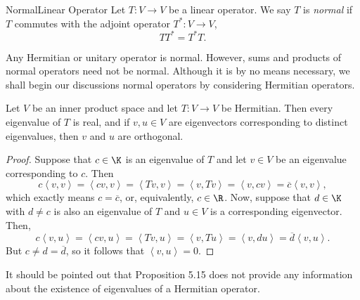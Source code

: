 \documentclass[linearalgebraII]{subfiles}
\begin{document}
    \begin{definition}{Normal}{Linear Operator}
        Let $T:V\to V$ be a linear operator. We say $T$ is \emph{normal} if $T$ commutes with the adjoint operator $T^*:V\to V$,
        \begin{equation*}
            TT^* = T^*T.
        \end{equation*}
    \end{definition}

    \noindent Any Hermitian or unitary operator is normal. However, sums and products of normal operators need not be normal. Although it is by no means necessary, we shall begin our discussions normal operators by considering Hermitian operators.

    \begin{prop}{}
        Let $V$ be an inner product space and let $T:V\to V$ be Hermitian. Then every eigenvalue of $T$ is real, and if $v,u\in V$ are eigenvectors corresponding to distinct eigenvalues, then $v$ and $u$ are orthogonal.
    \end{prop}

    \begin{proof}
        Suppose that $c\in\K$ is an eigenvalue of $T$ and let $v\in V$ be an eigenvalue corresponding to $c$. Then
        \begin{equation*}
            c\left\langle v, v\right\rangle = \left\langle cv, v\right\rangle = \left\langle Tv, v\right\rangle = \left\langle v, Tv\right\rangle = \left\langle v, cv\right\rangle = \overline{c} \left\langle v, v\right\rangle ,
        \end{equation*}
        which exactly means $c=\overline{c}$, or, equivalently, $c\in\R$. Now, suppose that $d\in\K$ with $d\neq c$ is also an eigenvalue of $T$ and $u\in V$ is a corresponding eigenvector. Then,
        \begin{equation*}
            c\left\langle v, u\right\rangle = \left\langle cv, u\right\rangle = \left\langle Tv, u\right\rangle = \left\langle v, Tu\right\rangle = \left\langle v, du\right\rangle = \overline{d} \left\langle v, u\right\rangle .
        \end{equation*}
        But $c\neq d=\overline{d}$, so it follows that $\left\langle v, u\right\rangle = 0$.
    \end{proof}

    \begin{remark}
        It should be pointed out that Proposition 5.15 does not provide any information about the existence of eigenvalues of a Hermitian operator.
    \end{remark}
\end{document}
